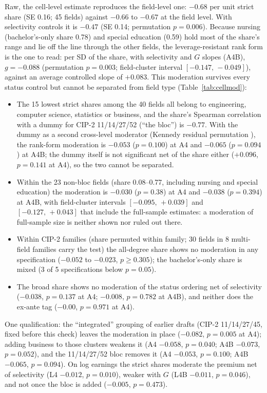 \documentclass[11pt]{article}
\newcommand{\ci}[2]{$[#1,\allowbreak\,#2]$}
\begin{document}
Raw, the cell-level estimate reproduces the field-level one: $-0.68$ per unit strict share (SE 0.16; 45 fields) against
$-0.66$ to $-0.67$ at the field level. With selectivity controls it is $-0.47$ (SE 0.14; permutation $p=0.006$). Because
nursing (bachelor's-only share 0.78) and special education (0.59) hold most of the share's range and lie off the line
through the other fields, the leverage-resistant rank form is the one to read: per SD of the share, with selectivity and
$G$ slopes (A4B), $g=-0.088$ (permutation $p=0.003$; field-cluster interval \ci{-0.147}{-0.049}), against an average controlled
slope of $+0.083$. This moderation survives every status control but cannot be separated from field type
(Table~\ref{tab:cellmod}):
\begin{itemize}
\item The 15 lowest strict shares among the 40 fields all belong to engineering, computer science, statistics or business,
and the share's Spearman correlation with a dummy for CIP-2 11/14/27/52 (``the bloc'') is $-0.77$. With the dummy as a second
cross-level moderator (Kennedy residual permutation \citep{kennedy1995randomization}), the rank-form moderation is $-0.053$ ($p=0.100$) at A4 and $-0.065$
($p=0.094$) at A4B; the dummy itself is not significant net of the share either ($+0.096$, $p=0.141$ at A4), so the two cannot be
separated.
\item Within the 23 non-bloc fields (share 0.08--0.77, including nursing and special education) the moderation is $-0.030$
($p=0.38$) at A4 and $-0.038$ ($p=0.394$) at A4B, with field-cluster intervals \ci{-0.095}{+0.039} and \ci{-0.127}{+0.043} that include the
full-sample estimates: a moderation of full-sample size is neither shown nor ruled out there.
\item Within CIP-2 families (share permuted within family; 30 fields in 8 multi-field families carry the test) the all-degree
share shows no moderation in any specification ($-0.052$ to $-0.023$, $p\ge0.305$); the bachelor's-only share is mixed (3 of 5
specifications below $p=0.05$).
\item The broad share shows no moderation of the status ordering net of selectivity ($-0.038$, $p=0.137$ at A4; $-0.008$, $p=0.782$ at
A4B), and neither does the ex-ante tag ($-0.00$, $p=0.971$ at A4).
\end{itemize}
One qualification: the ``integrated'' grouping of earlier drafts (CIP-2 11/14/27/45, fixed before this check) leaves the moderation
in place ($-0.082$, $p=0.005$ at A4); adding business to those clusters weakens it (A4 $-0.058$, $p=0.040$; A4B $-0.073$, $p=0.052$),
and the 11/14/27/52 bloc removes it (A4 $-0.053$, $p=0.100$; A4B $-0.065$, $p=0.094$). On log earnings
the strict shares moderate the premium net of selectivity (L4 $-0.012$, $p=0.010$), weaker with $G$ (L4B $-0.011$, $p=0.046$), and
not once the bloc is added ($-0.005$, $p=0.473$).
\end{document}
